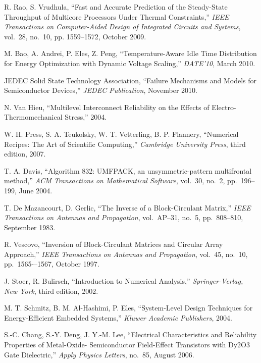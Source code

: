 \begin{thebibliography}{99}
    R. Rao, S. Vrudhula,
    ``Fast and Accurate Prediction of the Steady-State Throughput of Multicore Processors Under Thermal Constraints,''
    \emph{IEEE Transactions on Computer-Aided Design of Integrated Circuits and Systems},
    vol.~28, no.~10, pp. 1559--1572, October 2009.

    M. Bao, A. Andrei, P. Eles, Z. Peng,
    ``Temperature-Aware Idle Time Distribution for Energy Optimization with Dynamic Voltage Scaling,''
    \emph{DATE'10},
    March 2010.

    JEDEC Solid State Technology Association,
    ``Failure Mechanisms and Models for Semiconductor Devices,''
    \emph{JEDEC Publication},
    November 2010.

    N. Van Hieu,
    ``Multilevel Interconnect Reliability on the Effects of Electro-Thermomechanical Stress,''
    2004.

    W. H. Press, S. A. Teukolsky, W. T. Vetterling, B. P. Flannery,
    ``Numerical Recipes: The Art of Scientific Computing,''
    \emph{Cambridge University Press},
    third edition, 2007.

    T. A. Davis,
    ``Algorithm 832: UMFPACK, an unsymmetric-pattern multifrontal method,''
    \emph{ACM Transactions on Mathematical Software},
    vol.~30, no.~2, pp.~196--199, June 2004.

    T. De Mazancourt, D. Gerlic,
    ``The Inverse of a Block-Circulant Matrix,''
    \emph{IEEE Transactions on Antennas and Propagation},
    vol.~AP–31, no.~5, pp.~808–810, September 1983.

    R. Vescovo,
    ``Inversion of Block-Circulant Matrices and Circular Array Approach,''
    \emph{IEEE Transactions on Antennas and Propagation},
    vol.~45, no.~10, pp.~1565-–1567, October 1997.

    J. Stoer, R. Bulirsch,
    ``Introduction to Numerical Analysis,''
    \emph{Springer-Verlag, New York},
    third edition, 2002.

    M. T. Schmitz, B. M. Al-Hashimi, P. Eles,
    ``System-Level Design Techniques for Energy-Efficient Embedded Systems,''
    \emph{Kluwer Academic Publishers},
    2004.

    S.-C. Chang, S.-Y. Deng, J. Y.-M. Lee,
    ``Electrical Characteristics and Reliability Properties of Metal-Oxide- Semiconductor Field-Effect Transistors with Dy2O3 Gate Dielectric,''
    \emph{Apply Physics Letters},
    no.~85, August 2006.


\end{thebibliography}
